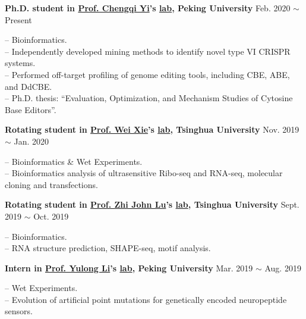 \textbf{Ph.D. student in \href{https://www.bio.pku.edu.cn/enhomes/news/teacher_dis/91.html}{Prof. Chengqi Yi}'s \href{https://yilab.org.cn/}{lab}, Peking University} \hfill Feb. 2020 $\sim$ Present

-- Bioinformatics.\\
-- Independently developed mining methods to identify novel type VI CRISPR systems.\\
-- Performed off-target profiling of genome editing tools, including CBE, ABE, and DdCBE\cite{lei2022mitochondrial,rao2023characterizing,lei2021detect,lei2023detect}.\\
-- Ph.D. thesis: ``Evaluation, Optimization, and Mechanism Studies of Cytosine Base Editors''.

\vspace{5pt}

\textbf{Rotating student in \href{https://life.tsinghua.edu.cn/lifeen/info/1034/1077.htm}{Prof. Wei Xie}'s \href{http://www.xielab.org.cn/}{lab}, Tsinghua University} \hfill Nov. 2019 $\sim$ Jan. 2020

-- Bioinformatics \& Wet Experiments.\\
-- Bioinformatics analysis of ultrasensitive Ribo-seq and RNA-seq, molecular cloning and transfections.

\vspace{5pt}

\textbf{Rotating student in \href{https://life.tsinghua.edu.cn/lifeen/info/1034/1083.htm}{Prof. Zhi John Lu}'s \href{https://lulab.life.tsinghua.edu.cn/labhome/home/}{lab}, Tsinghua University} \hfill Sept. 2019 $\sim$ Oct. 2019

-- Bioinformatics. \\
-- RNA structure prediction\cite{zhu2021integrative}, SHAPE-seq, motif analysis.


\vspace{5pt}


\textbf{Intern in \href{https://www.bio.pku.edu.cn/enhomes/news/teacher_dis/43.html}{Prof. Yulong Li}'s \href{http://www.yulonglilab.org/}{lab}, Peking University} \hfill Mar. 2019 $\sim$ Aug. 2019

-- Wet Experiments. \\
-- Evolution of artificial point mutations for genetically encoded neuropeptide sensors.


\vspace{5pt}


